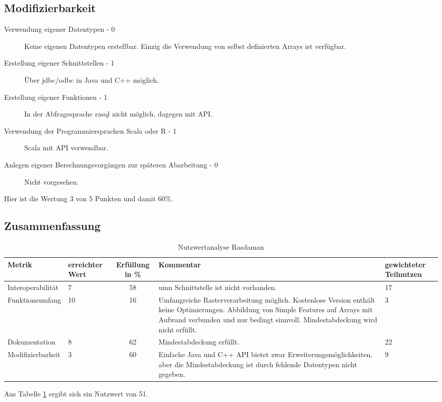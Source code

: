 \subsection{Modifizierbarkeit}
\begin{description}
\item[Verwendung eigener Datentypen - 0] Keine eigenen Datentypen erstellbar. Einzig die Verwendung von selbst definierten Arrays ist verfügbar.
\item[Erstellung eigener Schnittstellen - 1] Über \Gls{jdbc}/\Gls{odbc} in Java und C++ möglich.
\item[Erstellung eigener Funktionen - 1] In der Abfragesprache rasql nicht möglich, dagegen mit API.
\item[Verwendung der Programmiersprachen Scala oder R - 1] Scala mit API verwendbar.
\item[Anlegen eigener Berechnungsvorgängen zur späteren Abarbeitung - 0] Nicht vorgesehen.
\end{description}
Hier ist die Wertung 3 von 5 Punkten und damit 60\%.

\subsection{Zusammenfassung}
\begin{table}[h!]
\centering
\small
\begin{tabular}{l|p{1.8cm}|c|p{3.1cm}|p{1.8cm}}
\textbf{Metrik} & \textbf{erreichter Wert} & \textbf{Erfüllung in \%} & \textbf{Kommentar} & \textbf{gewichteter Teilnutzen} \\ \hline
Interoperabilität & 7 & 58 & \Gls{umn} Schnittstelle ist nicht vorhanden. & 17 \\ \hline
Funktionsumfang & 10 & 16 & Umfangreiche Rasterverarbeitung möglich. Kostenlose Version enthält keine Optimierungen. Abbildung von Simple Features auf Arrays mit Aufwand verbunden und nur bedingt sinnvoll. Mindestabdeckung wird nicht erfüllt. & 3 \\ \hline
Dokumentation & 8 & 62 & Mindestabdeckung erfüllt. & 22 \\ \hline
Modifizierbarkeit & 3 & 60 & Einfache Java und C++ API bietet zwar Erweiterungsmöglichkeiten, aber die Mindestabdeckung ist durch fehlende Datentypen nicht gegeben. & 9 \\
\end{tabular}
\caption{Nutzwertanalyse Rasdaman}
\label{table:nutzwertanalyse-rasdaman}
\end{table}
Aus Tabelle \ref{table:nutzwertanalyse-rasdaman} ergibt sich ein Nutzwert von 51.

